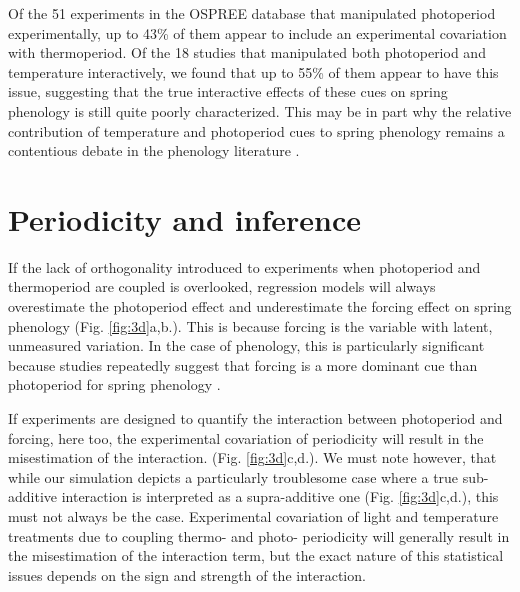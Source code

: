\documentclass[11pt]{article}
\begin{document}
Of the 51 experiments in the OSPREE database that manipulated photoperiod experimentally, up to 43\% of them appear to include an experimental covariation with thermoperiod. Of the 18 studies that manipulated both photoperiod and temperature interactively, we found that up to 55\% of them appear to have this issue, suggesting that the true interactive effects of these cues on spring phenology is still quite poorly characterized. This may be in part why the relative contribution of temperature and photoperiod cues to spring phenology remains a contentious debate in the phenology literature \citep{koerner2010a,CHUINE:2010wg,Jennifer:2010un}.

\section*{Periodicity and inference}
If the lack of orthogonality introduced to experiments when photoperiod and thermoperiod are coupled is overlooked, regression models will always overestimate the photoperiod effect and underestimate the forcing effect on spring phenology 
(Fig. \ref{fig:3d}a,b.). This is because forcing is the variable with latent, unmeasured variation. In the case of phenology, this is particularly significant because studies repeatedly suggest that forcing is a more dominant cue than photoperiod for spring phenology \citep{CHUINE:2010wg,Zohner:2016uz,Gauzere2019}.

If experiments are designed to quantify the interaction between photoperiod and forcing, here too, the experimental covariation of periodicity will result in the misestimation of the interaction. (Fig. \ref{fig:3d}c,d.). We must note however, that while our simulation depicts a particularly troublesome case where a true sub-additive interaction is interpreted as a supra-additive one (Fig. \ref{fig:3d}c,d.), this must not always be the case. Experimental covariation of light and temperature treatments due to coupling thermo- and photo- periodicity will generally result in the misestimation of the interaction term, but the exact nature of this statistical issues depends on the sign and strength of the interaction.

\end{document}
